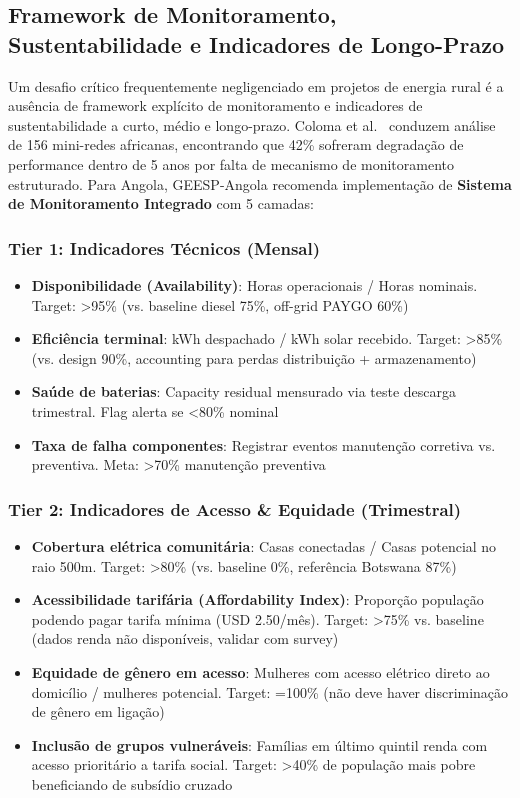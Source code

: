 \documentclass[12pt, a4paper]{article}
\begin{document}
\subsection{Framework de Monitoramento, Sustentabilidade e Indicadores de Longo-Prazo}

Um desafio crítico frequentemente negligenciado em projetos de energia rural é a ausência de framework explícito de monitoramento e indicadores de sustentabilidade a curto, médio e longo-prazo. Coloma et al.~\citep{Coloma2025} conduzem análise de 156 mini-redes africanas, encontrando que 42\% sofreram degradação de performance dentro de 5 anos por falta de mecanismo de monitoramento estruturado. Para Angola, GEESP-Angola recomenda implementação de \textbf{Sistema de Monitoramento Integrado} com 5 camadas:

\subsubsection{Tier 1: Indicadores Técnicos (Mensal)}
\begin{itemize}
\item \textbf{Disponibilidade (Availability)}: Horas operacionais / Horas nominais. Target: >95\% (vs. baseline diesel 75\%, off-grid PAYGO 60\%)
\item \textbf{Eficiência terminal}: kWh despachado / kWh solar recebido. Target: >85\% (vs. design 90\%, accounting para perdas distribuição + armazenamento)
\item \textbf{Saúde de baterias}: Capacity residual mensurado via teste descarga trimestral. Flag alerta se <80\% nominal
\item \textbf{Taxa de falha componentes}: Registrar eventos manutenção corretiva vs. preventiva. Meta: >70\% manutenção preventiva
\end{itemize}

\subsubsection{Tier 2: Indicadores de Acesso \& Equidade (Trimestral)}
\begin{itemize}
\item \textbf{Cobertura elétrica comunitária}: Casas conectadas / Casas potencial no raio 500m. Target: >80\% (vs. baseline 0\%, referência Botswana 87\%)
\item \textbf{Acessibilidade tarifária (Affordability Index)}: Proporção população podendo pagar tarifa mínima (USD 2.50/mês). Target: >75\% vs. baseline (dados renda não disponíveis, validar com survey)
\item \textbf{Equidade de gênero em acesso}: Mulheres com acesso elétrico direto ao domicílio / mulheres potencial. Target: =100\% (não deve haver discriminação de gênero em ligação)
\item \textbf{Inclusão de grupos vulneráveis}: Famílias em último quintil renda com acesso prioritário a tarifa social. Target: >40\% de população mais pobre beneficiando de subsídio cruzado
\end{itemize}
\end{document}

